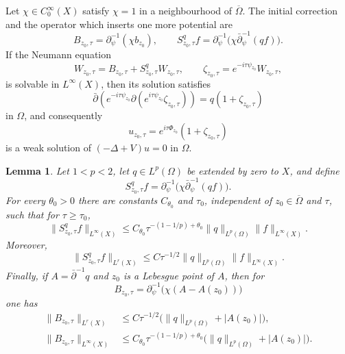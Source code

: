 \documentclass[a4paper,11pt]{article}
\theoremstyle{plain}
\newtheorem{lem}[thm]{Lemma}
\theoremstyle{definition}
\theoremstyle{remark}
\begin{document}
Let $\chi\in C_0^\infty(X)$ satisfy $\chi=1$ in a neighbourhood of $\overline\Omega$.  The initial correction and the operator which inserts one more potential are
\begin{equation}\label{B-S-def-general}
        B_{z_0,\tau}=\partial_\psi^{-1}(\chi b_{z_0}),
        \qquad
        S^q_{z_0,\tau}f=\partial_\psi^{-1}\bigl(\chi\bar\partial_\psi^{-1}(qf)\bigr).
\end{equation}
If the Neumann equation
\begin{equation}
        W_{z_0,\tau}=B_{z_0,\tau}+S^q_{z_0,\tau}W_{z_0,\tau},
        \qquad
        \zeta_{z_0,\tau}=e^{-i\tau\psi_{z_0}}W_{z_0,\tau},
\end{equation}
is solvable in $L^\infty(X)$, then its solution satisfies
\begin{equation}\label{conjugated-remainder-equation}
        \bar\partial\left(e^{-i\tau\psi_{z_0}}\partial(e^{i\tau\psi_{z_0}}\zeta_{z_0,\tau})\right)
        =q(1+\zeta_{z_0,\tau})
\end{equation}
in $\Omega$, and consequently
\begin{equation}\label{cgo-u-def}
        u_{z_0,\tau}=e^{i\tau\Phi_{z_0}}(1+\zeta_{z_0,\tau})
\end{equation}
is a weak solution of $(-\Delta+V)u=0$ in $\Omega$.


\begin{lem}\label{lem-bukhgeim-interpolation}
Let $1<p<2$, let $q\in L^p(\Omega)$ be extended by zero to $X$, and define
\begin{equation}
        S^q_{z_0,\tau}f=\partial_\psi^{-1}\bigl(\chi\bar\partial_\psi^{-1}(qf)\bigr).
\end{equation}
For every $\theta_0>0$ there are constants $C_{\theta_0}$ and $\tau_0$, independent of $z_0\in\overline\Omega$ and $\tau$, such that for $\tau\geq \tau_0$,
\begin{equation}\label{S-Linf-interpolated}
        \|S^q_{z_0,\tau}f\|_{L^\infty(X)}
        \leq C_{\theta_0} \tau^{-(1-1/p)+\theta_0}
        \|q\|_{L^p(\Omega)}\|f\|_{L^\infty(X)} .
\end{equation}
Moreover,
\begin{equation}\label{S-Lpstar-from-Linf}
        \|S^q_{z_0,\tau}f\|_{L^{r}(X)}
        \leq C \tau^{-1/2}
        \|q\|_{L^p(\Omega)}\|f\|_{L^\infty(X)} .
\end{equation}
Finally, if $A=\bar\partial^{-1}q$ and $z_0$ is a Lebesgue point of $A$, then for
\begin{equation}
        B_{z_0,\tau}=\partial_\psi^{-1}\bigl(\chi(A-A(z_0))\bigr)
\end{equation}
one has
\begin{align}
        \|B_{z_0,\tau}\|_{L^{r}(X)}
        &\leq C \tau^{-1/2}
        \bigl(\|q\|_{L^p(\Omega)}+|A(z_0)|\bigr),       \label{B-Lpstar-interpolated}\\
        \|B_{z_0,\tau}\|_{L^\infty(X)}
        &\leq C_{\theta_0} \tau^{-(1-1/p)+\theta_0}
        \bigl(\|q\|_{L^p(\Omega)}+|A(z_0)|\bigr).       \label{B-Linf-interpolated}
\end{align}
\end{lem}
\end{document}

